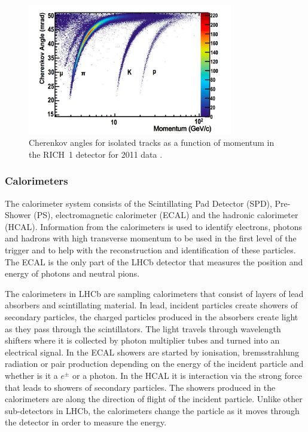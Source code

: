 \begin{figure}[htb]
  \centering
  \includegraphics[width=0.8\textwidth]{./Figs/LHC_LHCb/RICH1_performance.png}
  \caption{Cherenkov angles for isolated tracks as a function of momentum in the RICH~1 detector for 2011 data \cite{Adinolfi:2012qfa}.}
  \label{fig:RICH_preformance}
\end{figure}


\subsubsection{Calorimeters}
\label{Calo}

The calorimeter system consists of the Scintillating Pad Detector (SPD), Pre-Shower (PS), electromagnetic calorimeter (ECAL) and the hadronic calorimeter (HCAL). Information from the calorimeters is used to identify electrons, photons and hadrons with high transverse momentum to be used in the first level of the trigger and to help with the reconstruction and identification of these particles. The ECAL is the only part of the LHCb detector that measures the position and energy of photons and neutral pions. 

The calorimeters in LHCb are sampling calorimeters that consist of layers of lead absorbers and scintillating material. In lead, incident particles create showers of secondary particles, the charged particles produced in the absorbers create light as they pass through the scintillators. The light travels through wavelength shifters where it is collected by photon multiplier tubes and turned into an electrical signal. In the ECAL showers are started by ionisation, bremsstrahlung radiation or pair production depending on the energy of the incident particle and whether is it a $e^{\pm}$ or a photon. In the HCAL it is interaction via the strong force that leads to showers of secondary particles. The showers produced in the calorimeters are along the direction of flight of the incident particle. Unlike other sub-detectors in LHCb, the calorimeters change the particle as it moves through the detector in order to measure the energy.

